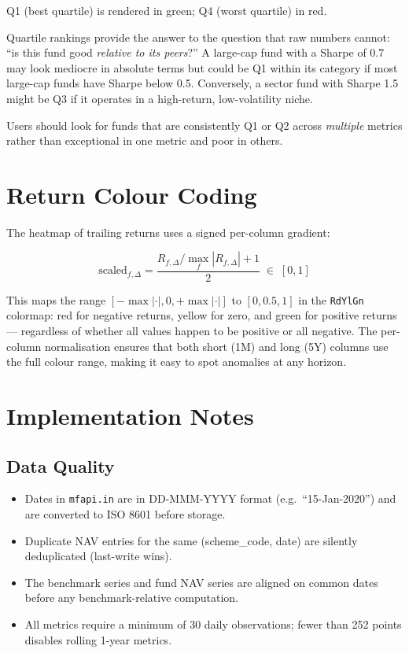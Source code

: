 \documentclass[12pt, a4paper]{article}
\begin{document}
Q1 (best quartile) is rendered in green; Q4 (worst quartile) in red.

\begin{interpretation}
Quartile rankings provide the answer to the question that raw numbers
cannot: ``is this fund good \emph{relative to its peers}?''  A
large-cap fund with a Sharpe of 0.7 may look mediocre in absolute terms
but could be Q1 within its category if most large-cap funds have Sharpe
below 0.5.  Conversely, a sector fund with Sharpe 1.5 might be Q3 if it
operates in a high-return, low-volatility niche.

Users should look for funds that are consistently Q1 or Q2 across
\emph{multiple} metrics rather than exceptional in one metric and poor
in others.
\end{interpretation}

\section{Return Colour Coding}

The heatmap of trailing returns uses a signed per-column gradient:

\[
  \text{scaled}_{f,\Delta} = \frac{R_{f,\Delta}/\max_f |R_{f,\Delta}| + 1}{2}
  \;\in\; [0, 1]
\]

This maps the range $[-\max|\cdot|, 0, +\max|\cdot|]$ to $[0, 0.5, 1]$
in the \texttt{RdYlGn} colormap: red for negative returns, yellow for zero,
and green for positive returns — regardless of whether all values happen to
be positive or all negative.  The per-column normalisation ensures that both
short (1M) and long (5Y) columns use the full colour range, making it easy
to spot anomalies at any horizon.

\section{Implementation Notes}

\subsection{Data Quality}

\begin{itemize}
  \item Dates in \texttt{mfapi.in} are in DD-MMM-YYYY format (e.g.\
    ``15-Jan-2020'') and are converted to ISO 8601 before storage.
  \item Duplicate NAV entries for the same (scheme\_code, date) are
    silently deduplicated (last-write wins).
  \item The benchmark series and fund NAV series are aligned on common
    dates before any benchmark-relative computation.
  \item All metrics require a minimum of 30 daily observations; fewer
    than 252 points disables rolling 1-year metrics.
\end{itemize}
\end{document}
